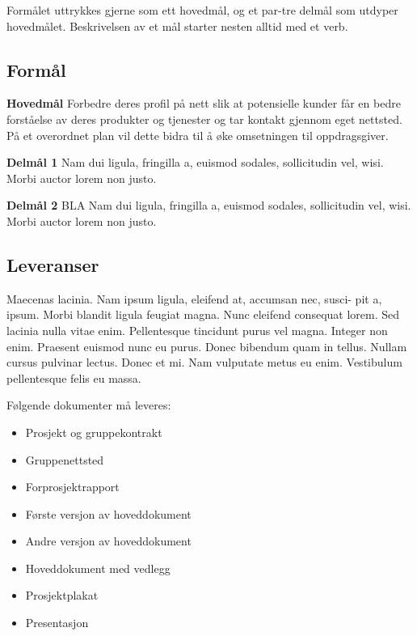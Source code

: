 \documentclass[11pt,a4paper]{report}
\begin{document}
Formålet uttrykkes gjerne som ett hovedmål, og et par-tre delmål som utdyper hovedmålet. Beskrivelsen av et mål starter nesten alltid med et verb.


\subsection*{Formål}

\begin{compactitem}
\item [{\bf Hovedmål}] Forbedre deres profil på nett slik at potensielle kunder får en bedre forståelse av deres produkter og tjenester og tar kontakt gjennom eget nettsted. På et overordnet plan vil dette bidra til å øke omsetningen til oppdragsgiver.
\begin{compactitem}
\item [{\bf  Delmål 1} ] Nam dui ligula, fringilla a, euismod sodales, sollicitudin vel, wisi. Morbi
auctor lorem non justo.
\item [{\bf  Delmål 2} ] BLA Nam dui ligula, fringilla a, euismod sodales, sollicitudin vel, wisi. Morbi
auctor lorem non justo.
\end{compactitem}
\end{compactitem}

\subsection*{Leveranser}

Maecenas lacinia. Nam ipsum ligula, eleifend at, accumsan nec, susci- pit a, ipsum. Morbi blandit ligula feugiat magna. Nunc eleifend consequat lorem. Sed lacinia nulla vitae enim. Pellentesque tincidunt purus vel magna. Integer non enim. Praesent euismod nunc eu purus. Donec bibendum quam in tellus. Nullam cursus pulvinar lectus. Donec et mi. Nam vulputate metus eu enim. Vestibulum pellentesque felis eu massa.

Følgende dokumenter må leveres:
\begin{itemize}
\item Prosjekt og gruppekontrakt
\item Gruppenettsted
\item Forprosjektrapport
\item Første versjon av hoveddokument
\item Andre versjon av hoveddokument
\item Hoveddokument med vedlegg
\item Prosjektplakat
\item Presentasjon
\end{itemize}
\end{document}
